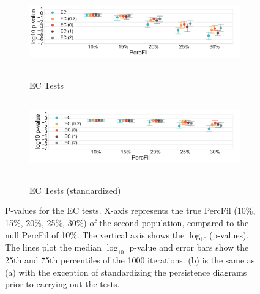 \documentclass[12pt]{article}
\begin{document}
\begin{figure}[htp!]
  \centering
  \begin{subfigure}{.75\textwidth}
    \centering
    \caption{EC Tests}
    \includegraphics[height = 1.25in]{figure_8_euler_group.pdf}
    \label{fig:sub_euler}
  \end{subfigure}
  \begin{subfigure}{.75\textwidth}
    \centering
    \caption{EC Tests (standardized)}
    \includegraphics[height = 1.25in]{figure_8_euler_group_normed.pdf}
    \label{fig:sub_euler_normed}
  \end{subfigure}
\caption{P-values for the EC tests. X-axis represents the true PercFil (10\%, 15\%, 20\%, 25\%, 30\%) of the second population, compared to the null PercFil of 10\%.
The vertical axis shows the $\log_{10}$(p-values). The lines plot the median $\log_{10}$ p-value and error bars show the 25th and 75th percentiles of the 1000 iterations. (b) is the same as (a) with the exception of standardizing the persistence diagrams prior to carrying out the tests. }
\label{fig:sub_euler_results}
\end{figure}
\end{document}
